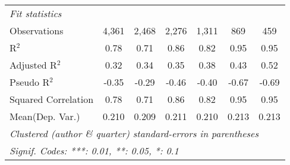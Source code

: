 \begin{tabular}{lcccccc}
   \midrule
   \emph{Fit statistics}\\
   Observations                                               & 4,361          & 2,468          & 2,276   & 1,311   & 869            & 459\\  
   R$^2$                                                      & 0.78           & 0.71           & 0.86    & 0.82    & 0.95           & 0.95\\  
   Adjusted R$^2$                                             & 0.32           & 0.34           & 0.35    & 0.38    & 0.43           & 0.52\\  
   Pseudo R$^2$                                               & -0.35          & -0.29          & -0.46   & -0.40   & -0.67          & -0.69\\  
   Squared Correlation                                        & 0.78           & 0.71           & 0.86    & 0.82    & 0.95           & 0.95\\  
Mean(Dep. Var.) & 0.210 & 0.209 & 0.211 & 0.210 & 0.213 & 0.213 \\
   \midrule \midrule
   \multicolumn{7}{l}{\emph{Clustered (author \& quarter) standard-errors in parentheses}}\\
   \multicolumn{7}{l}{\emph{Signif. Codes: ***: 0.01, **: 0.05, *: 0.1}}\\
\end{tabular}
\par\endgroup
